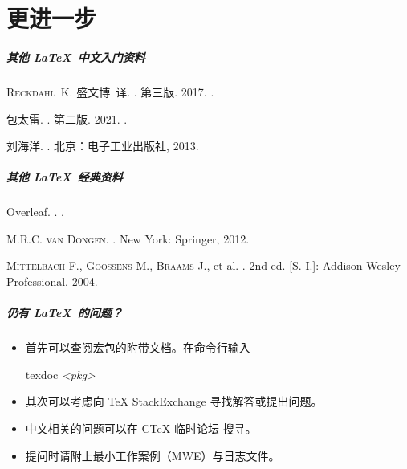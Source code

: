 
\part{更进一步}

\begin{frame}
  \frametitle{其他 \LaTeX\ 中文入门资料}
  \begin{thebibliography}{9}
      \textsc{Reckdahl~K.}
    盛文博~译.
     . 第三版. 2017.
    \newblock {}.

     包太雷.
     . 第二版. 2021.
    \newblock {}.

     刘海洋.
     . 
    北京：电子工业出版社, 2013.
  \end{thebibliography}
\end{frame}

\begin{frame}
  \frametitle{其他 \LaTeX\ 经典资料}
  \begin{thebibliography}{9}
     Overleaf.
     . 
    \newblock {}.

     \textsc{M.R.C. van Dongen}.
     . New York: Springer, 2012. 
    \newblock {}

     \textsc{Mittelbach F.}, \textsc{Goossens M.}, \textsc{Braams J.}, et al.
     . 2nd ed. [S. I.]: Addison-Wesley Professional. 2004.
  \end{thebibliography}
\end{frame}

\begin{frame}
  \frametitle{仍有 \LaTeX\ 的问题？}
  \begin{itemize}
    \item 首先可以查阅宏包的附带文档。在命令行输入
    
    \hfill
    \begin{minipage}{0.3\textwidth}
      \begin{exampleblock}{\faTerminal}
        \ttfamily
        texdoc \textit{<pkg>}
      \end{exampleblock}
    \end{minipage}
    \item 其次可以考虑向 \TeX{} StackExchange  寻找解答或提出问题。
    \item 中文相关的问题可以在 C\TeX{} 临时论坛  搜寻。
    \item 提问时请附上最小工作案例（MWE）与日志文件。
  \end{itemize}
\end{frame}

